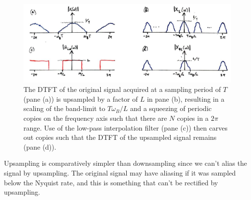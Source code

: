\begin{figure}[H]
  \includegraphics[width=\textwidth]{images/lecture_14_upsample.JPG}
  \caption{The DTFT of the original signal acquired at a sampling period of $T$
    (pane (a)) is upsampled by a factor of $L$ in pane (b), resulting in a scaling
    of the band-limit to $T\omega_B/L$ and a squeezing of periodic copies on
    the frequency axis such that there are $N$ copies in a $2\pi$ range.
    Use of the low-pass interpolation filter (pane (c)) then carves out
    copies such that the DTFT of the upsampled signal remains (pane (d)).
  }
  \label{fig::lecture_14_upsample}
\end{figure}
%
Upsampling is comparatively simpler than downsampling since we can't alias the
signal by upsampling. The original signal may have aliasing if it was
sampled below the Nyquist rate, and this is something that can't be rectified
by upsampling.
